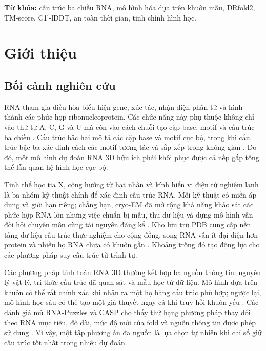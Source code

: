 \documentclass[12pt,a4paper,oneside]{report}
\newcommand{\cprime}{C1$^{\prime}$}
\begin{document}
\noindent\textbf{Từ khóa:} cấu trúc ba chiều RNA, mô hình hóa dựa trên khuôn mẫu,
DRfold2, TM-score, \cprime{}-lDDT, an toàn thời gian, tinh chỉnh hình học.

\tableofcontents
\listoftables
\listoffigures
\clearpage
{}

\chapter{Giới thiệu}
\label{chap:intro_vi}

\section{Bối cảnh nghiên cứu}

RNA tham gia điều hòa biểu hiện gene, xúc tác, nhận diện phân tử và hình thành các phức
hợp ribonucleoprotein. Các chức năng này phụ thuộc không chỉ vào thứ tự A, C, G và U mà
còn vào cách chuỗi tạo cặp base, motif và cấu trúc ba chiều
\cite{cao_rna_functions,tinoco_folding,butcher_tertiary}. Cấu trúc bậc hai mô tả các
cặp base và motif cục bộ, trong khi cấu trúc bậc ba xác định cách các motif tương tác và
sắp xếp trong không gian \cite{tinoco_folding,butcher_tertiary}. Do đó, một mô hình dự
đoán RNA 3D hữu ích phải khôi phục được cả nếp gấp tổng thể lẫn quan hệ hình học cục bộ.

Tinh thể học tia X, cộng hưởng từ hạt nhân và kính hiển vi điện tử nghiệm lạnh là ba
nhóm kỹ thuật chính để xác định cấu trúc RNA. Mỗi kỹ thuật có miền áp dụng và giới hạn
riêng; chẳng hạn, cryo-EM đã mở rộng khả năng khảo sát các phức hợp RNA lớn nhưng việc
chuẩn bị mẫu, thu dữ liệu và dựng mô hình vẫn đòi hỏi chuyên môn cùng tài nguyên đáng
kể \cite{zhang_experimental_review,ma_cryoem}. Kho lưu trữ PDB cung cấp nền tảng dữ
liệu cấu trúc thực nghiệm cho cộng đồng, song RNA vẫn ít đại diện hơn protein và nhiều
họ RNA chưa có khuôn gần \cite{pdb_archive,zhang_experimental_review}. Khoảng trống đó
tạo động lực cho các phương pháp suy cấu trúc từ trình tự.

Các phương pháp tính toán RNA 3D thường kết hợp ba nguồn thông tin: nguyên lý vật lý,
tri thức cấu trúc đã quan sát và mẫu học từ dữ liệu. Mô hình dựa trên khuôn có thể rất
chính xác khi nhận ra một họ hàng cấu trúc phù hợp; ngược lại, mô hình học sâu có thể
tạo một giả thuyết ngay cả khi truy hồi khuôn yếu \cite{rna_progress_review,drfold,
rhofoldplus,drfold2}. Các đánh giá mù RNA-Puzzles và CASP cho thấy thứ hạng phương pháp
thay đổi theo RNA mục tiêu, độ dài, mức độ mới của fold và nguồn thông tin được phép sử dụng
\cite{rna_puzzles,casp15,state_of_rnart}. Vì vậy, một tập phương án đa nguồn là lựa
chọn tự nhiên khi chỉ số giữ cấu trúc tốt nhất trong nhiều dự đoán.
\end{document}
